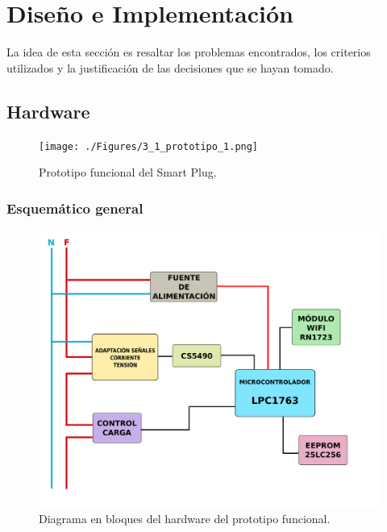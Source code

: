 \chapter{Diseño e Implementación} %

\label{Chapter3} %


La idea de esta sección es resaltar los problemas encontrados, los criterios utilizados y la justificación de las decisiones que se hayan tomado.

\section{Hardware}
\label{section:hardware}

\begin{figure}[h]
	\centering
	\texttt{[image: ./Figures/3\_1\_prototipo\_1.png]}
	\caption{Prototipo funcional del Smart Plug.}
	\label{fig:prototipo}
\end{figure}

\subsection{Esquemático general}

\begin{figure}[h]
	\centering
	\includegraphics[width=12cm]{./Figures/3_1_1_diagrama_bloques_hardware.png}
	\caption{Diagrama en bloques del hardware del prototipo funcional.}
	\label{fig:hardware_diagrama_bloques}
\end{figure}

